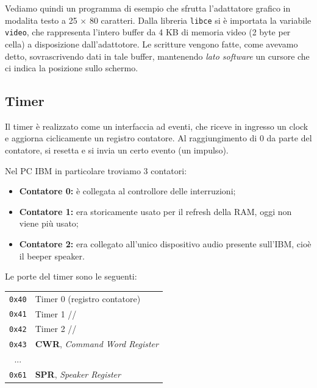 \documentclass[a4paper,11pt]{article}
\begin{document}
Vediamo quindi un programma di esempio che sfrutta l'adattatore grafico in modalita testo a 25 $\times$ 80 caratteri.
Dalla libreria \lstinline|libce| si è importata la variabile \lstinline|video|, che rappresenta l'intero buffer da 4 KB di memoria video (2 byte per cella) a disposizione dall'adattotore.
Le scritture vengono fatte, come avevamo detto, sovrascrivendo dati in tale buffer, mantenendo \textit{lato software} un cursore che ci indica la posizione sullo schermo.

\lstset{style=codestyle, language=c++}


\subsection{Timer}
Il timer è realizzato come un interfaccia ad eventi, che riceve in ingresso un clock e aggiorna ciclicamente un registro contatore.
Al raggiungimento di 0 da parte del contatore, si resetta e si invia un certo evento (un impulso).

Nel PC IBM in particolare troviamo 3 contatori:
\begin{itemize}
	\item \textbf{Contatore 0:} è collegata al controllore delle interruzioni;
	\item \textbf{Contatore 1:} era storicamente usato per il refresh della RAM, oggi non viene più usato;
	\item \textbf{Contatore 2:} era collegato all'unico dispositivo audio presente sull'IBM, cioè il beeper speaker.
\end{itemize}

Le porte del timer sono le seguenti:
\begin{table}[h!]
	\center
	\begin{tabular} { c | p{7cm} }
		\lstinline|0x40| & Timer 0 (registro contatore) \\
		\lstinline|0x41| & Timer 1 \hspace{1.2cm} // \\
		\lstinline|0x42| & Timer 2 \hspace{1.2cm} // \\
		\lstinline|0x43| & \textbf{CWR}, \textit{Command Word Register} \\
		\hline
		... & \\
		\hline
		\lstinline|0x61| & \textbf{SPR}, \textit{Speaker Register} \\
	\end{tabular}
\end{table}
\end{document}
